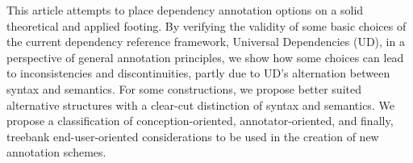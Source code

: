This article attempts to place dependency annotation options on a solid theoretical and applied footing. By verifying the validity of some basic choices of the current dependency reference framework, Universal Dependencies (UD), in a perspective of general annotation principles, we show how some choices can lead to inconsistencies and discontinuities, partly due to UD's alternation between syntax and semantics. For some constructions, we propose better suited alternative structures with a clear-cut distinction of syntax and semantics. We propose a classification of conception-oriented, annotator-oriented, and finally, treebank end-user-oriented considerations to be used in the creation of new annotation schemes.

